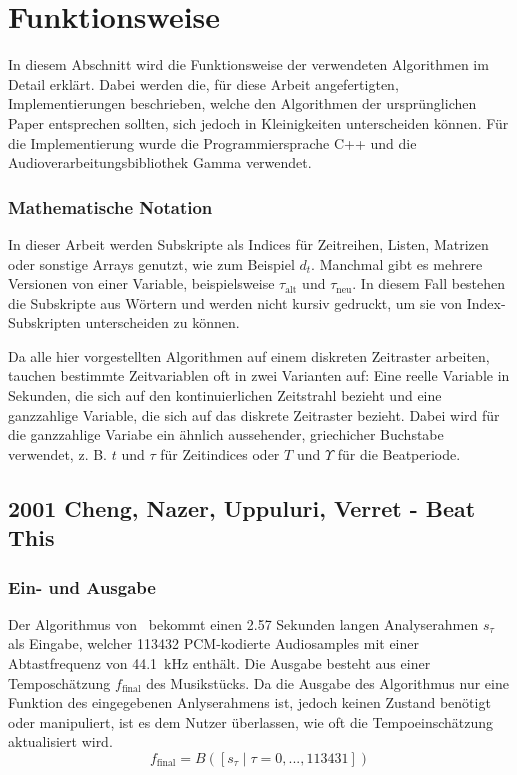 \section{Funktionsweise}
{

	In diesem Abschnitt wird die Funktionsweise der verwendeten Algorithmen im Detail erklärt.
	Dabei werden die, für diese Arbeit angefertigten, Implementierungen beschrieben,
		welche den Algorithmen der ursprünglichen Paper entsprechen sollten,
		sich jedoch in Kleinigkeiten unterscheiden können.
	Für die Implementierung wurde die Programmiersprache C++ und die Audioverarbeitungsbibliothek Gamma verwendet.

	\subsubsection*{Mathematische Notation}
	{
		In dieser Arbeit werden Subskripte als Indices für Zeitreihen, Listen, Matrizen oder sonstige Arrays genutzt,
			wie zum Beispiel $d_t$.
		Manchmal gibt es mehrere Versionen von einer Variable,
			beispielsweise $\tau_\text{alt}$ und $\tau_\text{neu}$.
		In diesem Fall bestehen die Subskripte aus Wörtern und werden nicht kursiv gedruckt,
			um sie von Index-Subskripten unterscheiden zu können.

		Da alle hier vorgestellten Algorithmen auf einem diskreten Zeitraster arbeiten,
			tauchen bestimmte Zeitvariablen oft in zwei Varianten auf:
		Eine reelle Variable in Sekunden,
			die sich auf den kontinuierlichen Zeitstrahl bezieht
			und eine ganzzahlige Variable,
			die sich auf das diskrete Zeitraster bezieht.
		Dabei wird für die ganzzahlige Variabe ein ähnlich aussehender, griechicher Buchstabe verwendet,
			z. B. $t$ und $\tau$ für Zeitindices
			oder $T$ und $\Upsilon$ für die Beatperiode.
	}

	\subsection{2001 Cheng, Nazer, Uppuluri, Verret - Beat This}
	{
		\subsubsection*{Ein- und Ausgabe}
		{
			Der Algorithmus von~\cite{2001_BeatThis} bekommt einen \num{2.57} Sekunden langen Analyserahmen $s_\tau$ als Eingabe,
				welcher \num{113432} PCM-kodierte Audiosamples mit einer Abtastfrequenz von \SI{44.1}{\kilo\hertz} enthält.
			Die Ausgabe besteht aus einer Temposchätzung $f_\text{final}$ des Musikstücks.
			Da die Ausgabe des Algorithmus nur eine Funktion des eingegebenen Anlyserahmens ist,
				jedoch keinen Zustand benötigt oder manipuliert,
				ist es dem Nutzer überlassen,
				wie oft die Tempoeinschätzung aktualisiert wird.
			\begin{equation}
				f_\text{final} = B([s_\tau \mid \tau = 0, ..., 113431])
			\end{equation}
		}

}}
